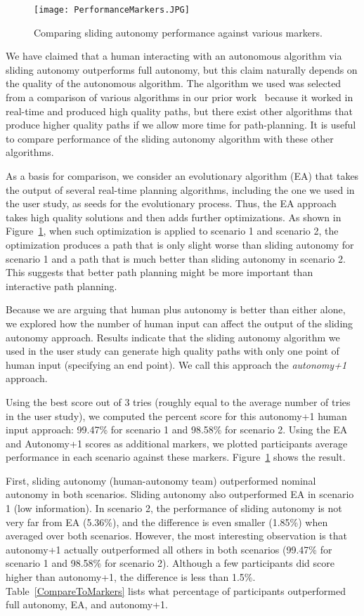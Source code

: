 \begin{figure}
\centering
\texttt{[image: PerformanceMarkers.JPG]}
\caption{Comparing sliding autonomy performance against various markers.}
\label{PerformanceMarkers}
\end{figure}

We have claimed that a human interacting with an autonomous algorithm via sliding autonomy outperforms full autonomy, but this claim naturally depends on the quality of the autonomous algorithm. The algorithm we used was selected from a comparison of various algorithms in our prior work~\cite{Lin2009UAV,Lin2014Hierarchical} because it worked in real-time and produced high quality paths, but there exist other algorithms that produce higher quality paths if we allow more time for path-planning. It is useful to compare performance of the sliding autonomy algorithm with these other algorithms.

As a basis for comparison, we consider an evolutionary algorithm  (EA) that takes the output of several real-time planning algorithms, including the one we used in the user study, as seeds for the evolutionary process. Thus, the EA approach takes high quality solutions and then adds further optimizations. As shown in Figure~\ref{PerformanceMarkers}, when such optimization is applied to scenario 1 and scenario 2, the optimization produces a path that is only slight worse than sliding autonomy for scenario 1 and a path that is much better than sliding autonomy in scenario 2. This suggests that better path planning might be more important than interactive path planning.

Because we are arguing that human plus autonomy is better than either alone, we explored how the number of human input can affect the output of the sliding autonomy approach. Results indicate that the sliding autonomy algorithm we used in the user study can generate high quality paths with only one point of human input (specifying an end point). We call this approach the \textit{autonomy+1} approach.

Using the best score out of 3 tries (roughly equal to the average number of tries in the user study), we computed the percent score for this autonomy+1 human input approach: 99.47\% for scenario 1 and 98.58\% for scenario 2. Using the EA and Autonomy+1 scores as additional markers, we plotted participants average performance in each scenario against these markers. Figure~\ref{PerformanceMarkers} shows the result.

First, sliding autonomy (human-autonomy team) outperformed nominal autonomy in both scenarios. Sliding autonomy also outperformed EA in scenario 1 (low information). In scenario 2, the performance of sliding autonomy is not very far from EA (5.36\%), and the difference is even smaller (1.85\%) when averaged over both scenarios. However, the most interesting observation is that autonomy+1 actually outperformed all others in both scenarios (99.47\% for scenario 1 and 98.58\% for scenario 2). Although a few participants did score higher than autonomy+1, the difference is less than 1.5\%. Table~\ref{CompareToMarkers} lists what percentage of participants outperformed full autonomy, EA, and autonomy+1.

